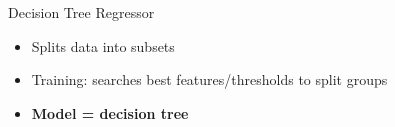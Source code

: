 \documentclass[9.5pt]{beamer}
\begin{document}
    \begin{frame}{Decision Tree Regressor}
        \begin{itemize}
            \item Splits data into subsets
            \item Training: searches best features/thresholds to split groups
            \item \textbf{Model = decision tree}
        \end{itemize}
        \begin{columns}[onlytextwidth]
            \begin{figure}
                \centering
            \end{figure}
            \begin{figure}
                \centering
            \end{figure}
        \end{columns}
    \end{frame}
\end{document}
